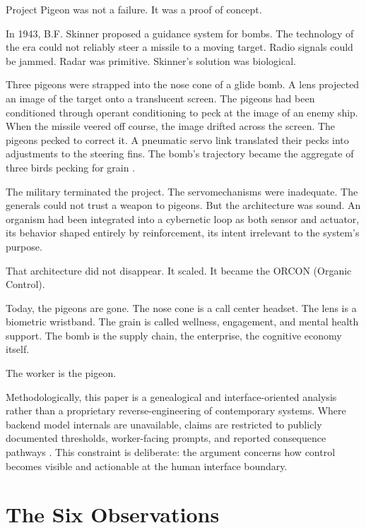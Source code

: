 \documentclass[runningheads]{llncs}
\begin{document}
Project Pigeon was not a failure. It was a proof of concept.

In 1943, B.F. Skinner proposed a guidance system for bombs. The technology of the era could not reliably steer a missile to a moving target. Radio signals could be jammed. Radar was primitive. Skinner's solution was biological.

Three pigeons were strapped into the nose cone of a glide bomb. A lens projected an image of the target onto a translucent screen. The pigeons had been conditioned through operant conditioning to peck at the image of an enemy ship. When the missile veered off course, the image drifted across the screen. The pigeons pecked to correct it. A pneumatic servo link translated their pecks into adjustments to the steering fins. The bomb's trajectory became the aggregate of three birds pecking for grain \cite{skinner1960pigeons,capshew1993engineering,wlodarczyk2020beyond}.

The military terminated the project. The servomechanisms were inadequate. The generals could not trust a weapon to pigeons. But the architecture was sound. An organism had been integrated into a cybernetic loop as both sensor and actuator, its behavior shaped entirely by reinforcement, its intent irrelevant to the system's purpose.

That architecture did not disappear. It scaled. It became the ORCON (Organic Control).

Today, the pigeons are gone. The nose cone is a call center headset. The lens is a biometric wristband. The grain is called wellness, engagement, and mental health support. The bomb is the supply chain, the enterprise, the cognitive economy itself. 

The worker is the pigeon.

Methodologically, this paper is a genealogical and interface-oriented analysis rather than a proprietary reverse-engineering of contemporary systems. Where backend model internals are unavailable, claims are restricted to publicly documented thresholds, worker-facing prompts, and reported consequence pathways \cite{kellogg2020algorithms,gurley2022vice,delagarza2019time}. This constraint is deliberate: the argument concerns how control becomes visible and actionable at the human interface boundary.

\section{The Six Observations}
\end{document}

